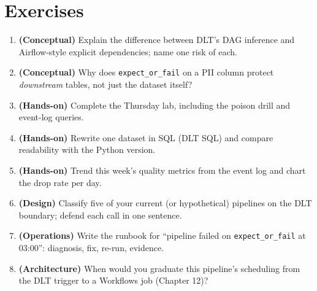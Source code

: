 \section{Exercises}
\begin{enumerate}
    \item \textbf{(Conceptual)} Explain the difference between DLT's DAG inference and Airflow-style explicit dependencies; name one risk of each.
    \item \textbf{(Conceptual)} Why does \texttt{expect\_or\_fail} on a PII column protect \emph{downstream} tables, not just the dataset itself?
    \item \textbf{(Hands-on)} Complete the Thursday lab, including the poison drill and event-log queries.
    \item \textbf{(Hands-on)} Rewrite one dataset in SQL (DLT SQL) and compare readability with the Python version.
    \item \textbf{(Hands-on)} Trend this week's quality metrics from the event log and chart the drop rate per day.
    \item \textbf{(Design)} Classify five of your current (or hypothetical) pipelines on the DLT boundary; defend each call in one sentence.
    \item \textbf{(Operations)} Write the runbook for ``pipeline failed on \texttt{expect\_or\_fail} at 03:00'': diagnosis, fix, re-run, evidence.
    \item \textbf{(Architecture)} When would you graduate this pipeline's scheduling from the DLT trigger to a Workflows job (Chapter 12)?
\end{enumerate}
